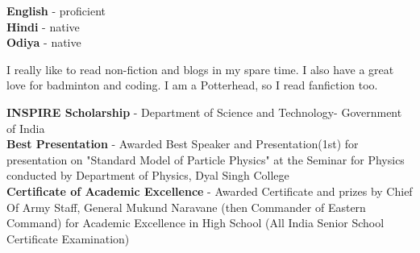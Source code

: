 \documentclass[9pt]{developercv} %
\begin{document}
\begin{minipage}[t]{0.3\textwidth}
	\vspace{-\baselineskip} %

	
	\textbf{English} - proficient\\
	\textbf{Hindi} - native\\
	\textbf{Odiya} - native
\end{minipage}
\hfill
\begin{minipage}[t]{0.3\textwidth}
	\vspace{-\baselineskip} %
	
	
	I really like to read non-fiction and blogs in my spare time. I also have a great love for badminton and coding. I am a Potterhead, so I read fanfiction too.  
\end{minipage}
\hfill
\begin{minipage}[t]{0.3\textwidth}
	\vspace{-\baselineskip} %
	
	
	\textbf{INSPIRE Scholarship} - Department of Science and Technology- Government of India \\
	\textbf{Best Presentation} - Awarded Best Speaker and Presentation(1st) for presentation on "Standard Model of Particle Physics" at the Seminar for Physics conducted by Department of Physics, Dyal Singh College\\
	\textbf{Certificate of Academic Excellence} - Awarded Certificate and prizes by Chief Of Army Staff, General Mukund Naravane (then Commander of Eastern Command) for Academic Excellence in High School (All India Senior School Certificate Examination)
\end{minipage}

\end{document}
